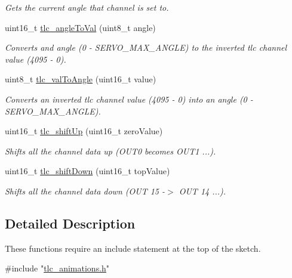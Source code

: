 \begin{DoxyCompactItemize}
\begin{DoxyCompactList}\small\item\em Gets the current angle that channel is set to. \end{DoxyCompactList}\item 
uint16\+\_\+t \hyperlink{group__ExtendedFunctions_ga4583e7fd6068bc60670fa1d8213b7058}{tlc\+\_\+angle\+To\+Val} (uint8\+\_\+t angle)
\begin{DoxyCompactList}\small\item\em Converts and angle (0 -\/ S\+E\+R\+V\+O\+\_\+\+M\+A\+X\+\_\+\+A\+N\+G\+LE) to the inverted tlc channel value (4095 -\/ 0). \end{DoxyCompactList}\item 
uint8\+\_\+t \hyperlink{group__ExtendedFunctions_ga0d85d1813cdd7bca0d5aeea2e00aa896}{tlc\+\_\+val\+To\+Angle} (uint16\+\_\+t value)
\begin{DoxyCompactList}\small\item\em Converts an inverted tlc channel value (4095 -\/ 0) into an angle (0 -\/ S\+E\+R\+V\+O\+\_\+\+M\+A\+X\+\_\+\+A\+N\+G\+LE). \end{DoxyCompactList}\item 
uint16\+\_\+t \hyperlink{group__ExtendedFunctions_gad499bc0e483c5b25efb839ade79bcaa0}{tlc\+\_\+shift\+Up} (uint16\+\_\+t zero\+Value)
\begin{DoxyCompactList}\small\item\em Shifts all the channel data up (O\+U\+T0 becomes O\+U\+T1 ...). \end{DoxyCompactList}\item 
uint16\+\_\+t \hyperlink{group__ExtendedFunctions_gaed782802c116fdd531198281b196908b}{tlc\+\_\+shift\+Down} (uint16\+\_\+t top\+Value)
\begin{DoxyCompactList}\small\item\em Shifts all the channel data down (O\+UT 15 -\/$>$ O\+UT 14 ...). \end{DoxyCompactList}\end{DoxyCompactItemize}


\subsection{Detailed Description}
These functions require an include statement at the top of the sketch. 


\begin{DoxyCode}
\textcolor{preprocessor}{#include "\hyperlink{tlc__animations_8h}{tlc\_animations.h}"} 
\end{DoxyCode}

